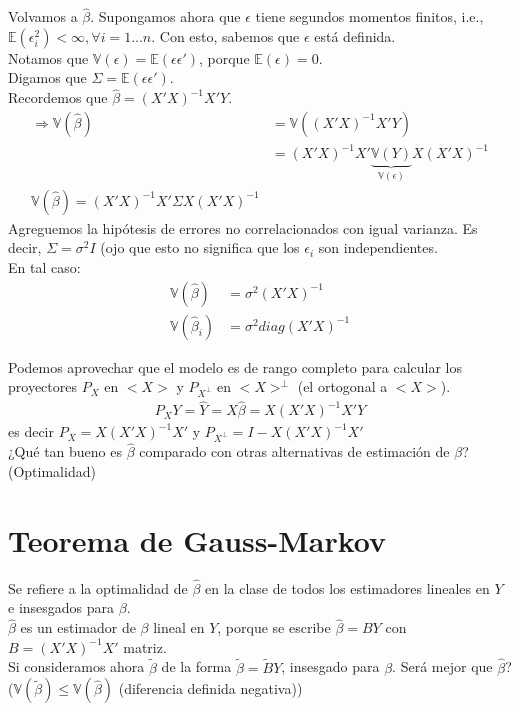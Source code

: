 \documentclass[10pt]{article}
\theoremstyle{plain}
\theoremstyle{definition}
\begin{document}
Volvamos a $\hat{\beta}$. Supongamos ahora que $\epsilon$ tiene segundos momentos finitos, i.e., $\mathbb{E}(\epsilon_{i}^2) < \infty, \forall i = 1\ldots n$. Con esto, sabemos que $\mathbb{\epsilon}$ está definida.\\
Notamos que $\mathbb{V}(\epsilon) = \mathbb{E}(\epsilon\epsilon')$, porque $\mathbb{E}(\epsilon) = 0$.\\
Digamos que $\Sigma = \mathbb{E}(\epsilon\epsilon')$.\\
Recordemos que $\hat{\beta} = (X'X)^{-1}X'Y$.\\
\begin{align*}
\Rightarrow \mathbb{V}(\hat{\beta}) &= \mathbb{V}((X'X)^{-1}X'Y)\\
&= (X'X)^{-1}X' \underbrace{\mathbb{V}(Y)}_{\mathbb{V}(\epsilon)}X(X'X)^{-1}\\
\mathbb{V}(\hat{\beta}) = (X'X)^{-1}X' \Sigma X(X'X)^{-1}
\end{align*}
Agreguemos la hipótesis de errores no correlacionados con igual varianza. Es decir, $\Sigma = \sigma^2 I$ (ojo que esto no significa que los $\epsilon_{i}$ son independientes.\\

En tal caso:
\begin{align*}
\mathbb{V}(\hat{\beta}) &= \sigma^2(X'X)^{-1}\\
\mathbb{V}(\hat{\beta}_{i}) &= \sigma^2 diag(X'X)^{-1}
\end{align*}

Podemos aprovechar que el modelo es de rango completo para calcular los proyectores $P_{X}$ en $<X>$ y $P_{X^{\perp}}$ en $<X>^{\perp}$ (el ortogonal a $<X>$).
\begin{align*}
P_{X}Y = \hat{Y} = X \hat{\beta} = X(X'X)^{-1}X'Y
\end{align*}
es decir $P_{X}= X(X'X)^{-1}X'$ y $P_{X^{\perp}} = I - X(X'X)^{-1}X'$\\

¿Qué tan bueno es $\hat{\beta}$ comparado con otras alternativas de estimación de $\beta$? (Optimalidad)

\section{Teorema de Gauss-Markov}
Se refiere a la optimalidad de $\hat{\beta}$ en la clase de todos los estimadores lineales en $Y$ e insesgados para $\beta$.\\
$\hat{\beta}$ es un estimador de $\beta$ lineal en $Y$, porque se escribe $\hat{\beta} = BY$ con $B=(X'X)^{-1}X'$ matriz.\\
Si consideramos ahora $\tilde{\beta}$ de la forma $\tilde{\beta} = \tilde{B}Y$, insesgado para $\beta$. Será mejor que $\hat{\beta}$? ($\mathbb{V}(\tilde{\beta}) \le \mathbb{V}(\hat{\beta})$ (diferencia definida negativa))\\
\end{document}

